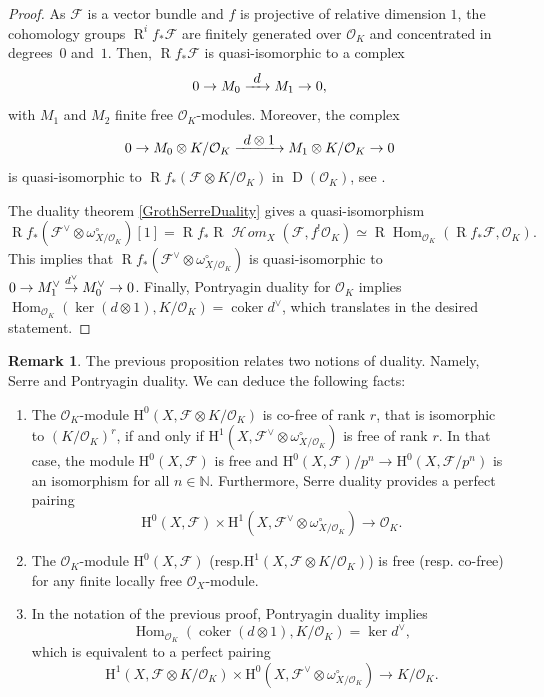 \documentclass[11pt]{article}
\newcommand{\resp}{resp.\xspace}
\newcommand\To[1]{\mathchoice{\xrightarrow{\textstyle\kern4pt#1\kern3pt}}{\stackrel{#1}{\to}}{}{}}
\numberwithin{equation}{section}
\theoremstyle{definition}
\newtheorem{remark}[prop]{Remark}
\newcommand{\bb}[1]{\mathbb{#1}}
\newcommand{\n}[1]{\mathcal{#1}}
\newcommand{\s}[1]{\mathscr{#1}}
\DeclareMathOperator{\R}{R}
\DeclareMathOperator{\D}{D}
\DeclareMathOperator{\Hom}{Hom}
\DeclareMathOperator{\coker}{coker}
\DeclareMathOperator{\sHom}{\s{H}\!\mathit{om}}
\begin{document}
\begin{proof}
As $\n{F}$ is a vector bundle and $f$ is projective of relative dimension $1$, the cohomology groups $\R^i f_* \n{F}$ are finitely generated over $\n{O}_K$ and concentrated in degrees~$0$ and~$1$. Then, $\R f_* \n{F}$ is quasi-isomorphic to a complex
\[
0 \to M_0 \To{d}M_1\to 0,
\]
with $M_1$ and $M_2$ finite free $\n{O}_K$-modules. Moreover, the complex
\[
0 \to M_0\otimes K/\n{O}_K \To{d\otimes 1} M_1\otimes K/\n{O}_K \to 0
\]
is quasi-isomorphic to $\R f_*(\n{F}\otimes K/\n{O}_K)$ in $\D(\n{O}_K)$, see \cite[Th.\,5.2]{mumford1974abelian}.

The duality theorem \ref{GrothSerreDuality} gives a quasi-isomorphism
\[
\R f_*(\n{F}^{\vee}\otimes \omega^{\circ}_{X/\n{O}_K})[1] =\R f_*\R\sHom_{X}(\n{F}, f^!\n{O}_K)\simeq \R\Hom_{\n{O}_K}(\R f_*\n{F}, \n{O}_K).
\]
This implies that $\R f_* (\n{F}^\vee \otimes \omega_{X/\n{O}_K}^\circ)$ is quasi-isomorphic to $0 \to M_1^\vee \To{d^\vee}M_0^\vee \to 0$. Finally, Pontryagin duality for $\n{O}_K$ implies $\Hom_{\n{O}_K}(\ker(d\otimes 1), K/\n{O}_K)= \coker d^\vee$, which translates in the desired statement.
\end{proof}

\begin{remark}
\label{Remarkduality}
The previous proposition relates two notions of duality. Namely, Serre and Pontryagin duality. We can deduce the following facts:

\begin{enumerate}

\item\label{Remarkduality1} The $\n{O}_K$-module $\mathrm{H}^0(X, \n{F}\otimes K/\n{O}_K)$ is co-free of rank $r$, that is isomorphic to $(K/\n{O}_K)^r$, if and only if $\mathrm{H}^1(X, \n{F}^\vee \otimes \omega_{X/\n{O}_K}^{\circ})$ is free of rank $r$. In that case, the module $\mathrm{H}^0(X, \n{F})$ is free and $\mathrm{H}^0(X, \n{F})/p^n \to \mathrm{H}^0(X,\n{F}/p^n)$ is an isomorphism for all $n\in \bb{N}$. Furthermore, Serre duality provides a perfect pairing
\[
\mathrm{H}^0(X, \n{F}) \times \mathrm{H}^1(X, \n{F}^\vee \otimes \omega^\circ_{X/\n{O}_K})\to \n{O}_K.
\]

\item\label{Remarkduality2} The $\n{O}_K$-module $\mathrm{H}^0(X,\n{F})$ (\resp $\mathrm{H}^1(X, \n{F}\otimes K/\n{O}_K)$) is free (\resp co-free) for any finite locally free $\s{O}_X$-module.

\item\label{Remarkduality3} In the notation of the previous proof, Pontryagin duality implies
\[\Hom_{\n{O}_K}(\coker(d\otimes 1), K/\n{O}_K)=\ker d^{\vee},\]
which is equivalent to a perfect pairing
\[
\mathrm{H}^1(X, \n{F}\otimes K/\n{O}_K) \times \mathrm{H}^0(X,\n{F}^\vee\otimes \omega_{X/\n{O}_K}^\circ)\to K/\n{O}_K.
\]
\end{enumerate}
\end{remark}
\end{document}
